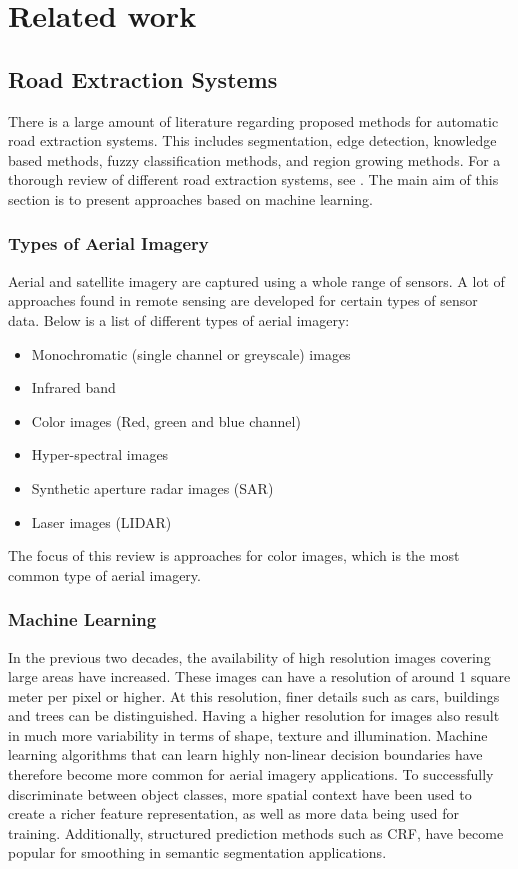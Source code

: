 \section{Related work}
\label{sec:related_works}
\subsection{Road Extraction Systems}
There is a large amount of literature regarding proposed methods for automatic road extraction systems. This includes segmentation, edge detection, knowledge based methods, fuzzy classification methods, and region growing methods. For a thorough review of different road extraction systems, see \citep{Trinder_towards_automation}
\citep{Mena_GIS_state_of_the_art}. The main aim of this section is to present approaches based on machine learning.

\subsubsection{Types of Aerial Imagery}
Aerial and satellite imagery are captured using a whole range of sensors. A lot of approaches found in remote sensing are developed for certain types of sensor data. Below is a list of different types of aerial imagery:
\begin{itemize}
 \item Monochromatic (single channel or greyscale) images 
 \item Infrared band
 \item Color images (Red, green and blue channel)
 \item Hyper-spectral images
 \item Synthetic aperture radar images (SAR)
 \item Laser images (LIDAR)
 \end{itemize}

The focus of this review is approaches for color images, which is the most common type of aerial imagery.

\subsubsection{Machine Learning}
In the previous two decades, the availability of high resolution images covering large areas have increased. These images can have a resolution of around 1 square meter per pixel or higher. At this resolution, finer details such as cars, buildings and trees can be distinguished. Having a higher resolution for images also result in much more variability in terms of shape, texture and illumination. Machine learning algorithms that can learn highly non-linear decision boundaries have therefore become more common for aerial imagery applications. To successfully discriminate between object classes, more spatial context have been used to create a richer feature representation, as well as more data being used for training. Additionally, structured prediction methods such as \ac{CRF}, have become popular for smoothing in semantic segmentation applications.


